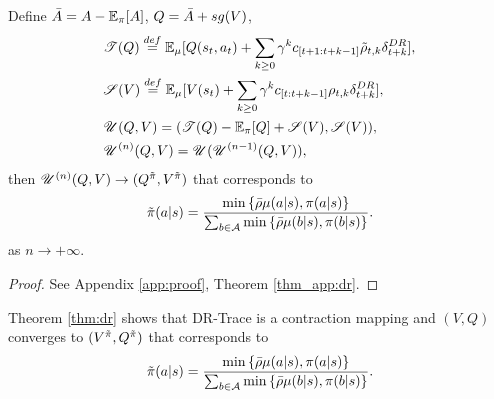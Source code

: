 \begin{theorem}
    Define $\Bar{A} = A - \mathbb{E}_\pi[A]$, $Q = \Bar{A} + sg(V)$,
    $$
    \begin{aligned}
    &\mathscr{T}(Q) \overset{def}{=} \mathbb{E}_{\mu}   [
        Q(s_t, a_t) + \sum_{k \geq 0}  \gamma^k
        c_{[t+1:t+k-1]} \Tilde{\rho}_{t, k}
        \delta^{DR}_{t+k}
        ], \\
    &\mathscr{S}(V) \overset{def}{=} \mathbb{E}_{\mu}   [
        V(s_t) + \sum_{k \geq 0}  \gamma^k
        c_{[t:t+k-1]} \rho_{t, k}
        \delta^{DR}_{t+k}
        ], \\
    &\mathscr{U}(Q, V) = (\mathscr{T}(Q) - \mathbb{E}_\pi[Q] + \mathscr{S}(V), \mathscr{S}(V)), \\
    &\mathscr{U}^{(n)}(Q, V) = \mathscr{U}(\mathscr{U}^{(n-1)}(Q, V)),
    \end{aligned}
    $$
    then $\mathscr{U}^{(n)}(Q, V) \rightarrow (Q^{\Tilde{\pi}}, V^{\Tilde{\pi}})$ that corresponds to 
    $$
        \Tilde{\pi}(a|s) = \frac
        {\min \left\{\Bar{\rho} \mu (a|s), \pi(a|s)\right\}}
        {\sum_{b \in \mathcal{A}}\min \left\{\Bar{\rho} \mu (b|s), \pi(b|s)\right\}}.
    $$ as $n \rightarrow +\infty$.
\label{thm:dr}
\end{theorem}
\begin{proof}
    See Appendix \ref{app:proof}, Theorem \ref{thm_app:dr}.
\end{proof}
Theorem \ref{thm:dr} shows that DR-Trace is a contraction mapping and $(V, Q)$ converges to $(V^{\Tilde{\pi}}, Q^{\Tilde{\pi}})$ that corresponds to 
$$
    \begin{aligned}
        \Tilde{\pi}(a|s) = \frac
        {\min \left\{\Bar{\rho} \mu (a|s), \pi(a|s)\right\}}
        {\sum_{b \in \mathcal{A}}\min \left\{\Bar{\rho} \mu (b|s), \pi(b|s)\right\}}.
    \end{aligned}
$$

